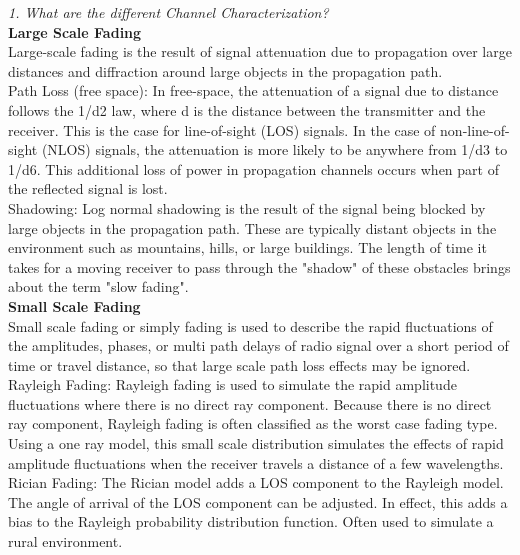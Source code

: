 \documentclass[a4paper]{article}
\begin{document}
\textit{1. What are the different Channel Characterization?}\\
\bigskip
\textbf{Large Scale Fading}\\
Large-scale fading is the result of signal attenuation due to propagation over large distances and diffraction around large objects in the propagation path.\\
\smallskip
\textsf{Path Loss (free space): } In free-space, the attenuation of a signal due to distance follows the 1/d2 law, where d is the distance between the transmitter and the receiver. This is the case for line-of-sight (LOS) signals. In the case of non-line-of-sight (NLOS) signals, the attenuation is more likely to be anywhere from 1/d3 to 1/d6. This additional loss of power in propagation channels occurs when part of the reflected signal is lost.\\
\smallskip
\textsf{Shadowing: } Log normal shadowing is the result of the signal being blocked by large objects in the propagation path. These are typically distant objects in the environment such as mountains, hills, or large buildings. The length of time it takes for a moving receiver to pass through the "shadow" of these obstacles brings about the term "slow fading".\\
\bigskip
\textbf{Small Scale Fading}\\
Small scale fading or simply fading is used to describe the rapid fluctuations of the amplitudes, phases, or multi path delays of radio signal over a short period of time or travel distance, so that large scale path loss effects may be ignored.\\
\smallskip
\textsf{Rayleigh Fading: } Rayleigh fading is used to simulate the rapid amplitude fluctuations where there is no direct ray component. Because there is no direct ray component, Rayleigh fading is often classified as the worst case fading type. Using a one ray model, this small scale distribution simulates the effects of rapid amplitude fluctuations when the receiver travels a distance of a few wavelengths.\\
\smallskip
\textsf{Rician Fading: } The Rician model adds a LOS component to the Rayleigh model. The angle of arrival of the LOS component can be adjusted. In effect, this adds a bias to the Rayleigh probability distribution function. Often used to simulate a rural environment.\\
\end{document}
